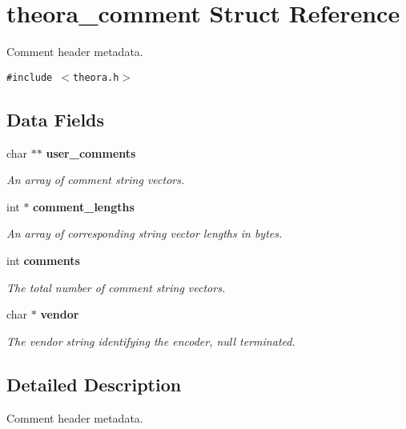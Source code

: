 \section{theora\_\-comment Struct Reference}
\label{structtheora__comment}
Comment header metadata.  


{\tt \#include $<$theora.h$>$}

\subsection*{Data Fields}
\begin{CompactItemize}
\item 
char $\ast$$\ast$ {\bf user\_\-comments}\label{structtheora__comment_5cf2d0a7ac70e6f5fa286da7a3c2edef}

\begin{CompactList}\small\item\em An array of comment string vectors. \item\end{CompactList}\item 
int $\ast$ {\bf comment\_\-lengths}\label{structtheora__comment_3ae630a111e08d268bd9455089e2d549}

\begin{CompactList}\small\item\em An array of corresponding string vector lengths in bytes. \item\end{CompactList}\item 
int {\bf comments}\label{structtheora__comment_72742a6f74e87e4363d5f11c42837b97}

\begin{CompactList}\small\item\em The total number of comment string vectors. \item\end{CompactList}\item 
char $\ast$ {\bf vendor}\label{structtheora__comment_3f0da11f1a775c63109f9c0c2fbb5fc5}

\begin{CompactList}\small\item\em The vendor string identifying the encoder, null terminated. \item\end{CompactList}\end{CompactItemize}


\subsection{Detailed Description}
Comment header metadata. 

